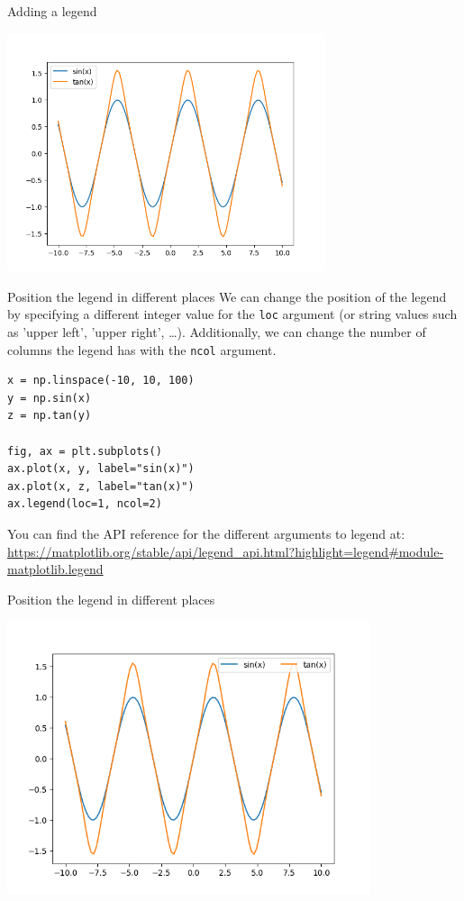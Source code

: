 \documentclass[10pt]{beamer}
\begin{document}
\begin{frame}[label={sec:org353839f}]{Adding a legend}
\begin{center}
\includegraphics[width=0.7\textwidth]{images/legend.png}
\end{center}
\end{frame}

\begin{frame}[label={sec:orge68331d},fragile]{Position the legend in different places}
 We can change the position of the legend by specifying a different integer value
for the \texttt{loc} argument (or string values such as 'upper left', 'upper right',
\ldots{}). Additionally, we can change the number of columns the legend has with the
\texttt{ncol} argument.

\begin{verbatim}
x = np.linspace(-10, 10, 100)
y = np.sin(x)
z = np.tan(y)

fig, ax = plt.subplots()
ax.plot(x, y, label="sin(x)")
ax.plot(x, z, label="tan(x)")
ax.legend(loc=1, ncol=2)
\end{verbatim}

You can find the API reference for the different arguments to legend at: \url{https://matplotlib.org/stable/api/legend\_api.html?highlight=legend\#module-matplotlib.legend}
\end{frame}

\begin{frame}[label={sec:org772edff}]{Position the legend in different places}
\begin{center}
\includegraphics[width=0.8\textwidth]{images/legend-2.png}
\end{center}
\end{frame}
\end{document}
